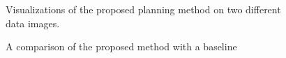 \begin{figure}[h]
    \hfill
    \caption{Visualizations of the proposed planning method on two different data images.}
    \label{fig:results:ipp_unpairqual}
\end{figure}


\begin{figure}[h]
    \hfill
    \caption{A comparison of the proposed method with a baseline}
    \label{fig:results:ipp_paired}
\end{figure}

